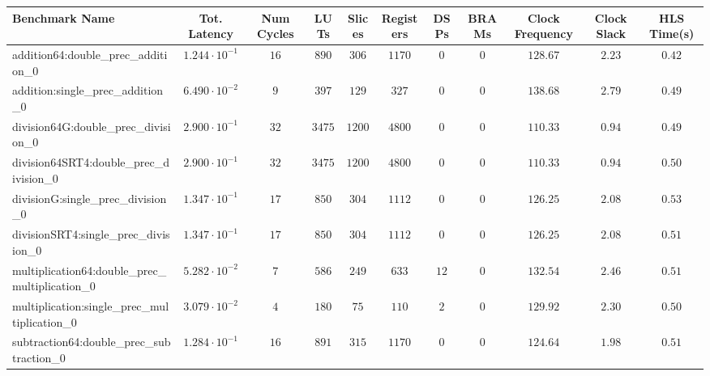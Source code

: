 \begin{tabular}{|l|c|c|c|c|c|c|c|c|c|c|}
\hline
Benchmark Name                                   & Tot. Latency            & Num Cycles & LUTs      & Slices   & Registers & DSPs   & BRAMs & Clock Frequency & Clock Slack & HLS Time(s) \\
\hline
addition64:double\_prec\_addition\_0             & $ 1.244 \cdot 10^{-1} $ & $ 16     $ & $ 890   $ & $ 306  $ & $ 1170  $ & $ 0  $ & $ 0 $ & $ 128.67      $ & $ 2.23    $ & $ 0.42    $ \\
addition:single\_prec\_addition\_0               & $ 6.490 \cdot 10^{-2} $ & $ 9      $ & $ 397   $ & $ 129  $ & $ 327   $ & $ 0  $ & $ 0 $ & $ 138.68      $ & $ 2.79    $ & $ 0.49    $ \\
division64G:double\_prec\_division\_0            & $ 2.900 \cdot 10^{-1} $ & $ 32     $ & $ 3475  $ & $ 1200 $ & $ 4800  $ & $ 0  $ & $ 0 $ & $ 110.33      $ & $ 0.94    $ & $ 0.49    $ \\
division64SRT4:double\_prec\_division\_0         & $ 2.900 \cdot 10^{-1} $ & $ 32     $ & $ 3475  $ & $ 1200 $ & $ 4800  $ & $ 0  $ & $ 0 $ & $ 110.33      $ & $ 0.94    $ & $ 0.50    $ \\
divisionG:single\_prec\_division\_0              & $ 1.347 \cdot 10^{-1} $ & $ 17     $ & $ 850   $ & $ 304  $ & $ 1112  $ & $ 0  $ & $ 0 $ & $ 126.25      $ & $ 2.08    $ & $ 0.53    $ \\
divisionSRT4:single\_prec\_division\_0           & $ 1.347 \cdot 10^{-1} $ & $ 17     $ & $ 850   $ & $ 304  $ & $ 1112  $ & $ 0  $ & $ 0 $ & $ 126.25      $ & $ 2.08    $ & $ 0.51    $ \\
multiplication64:double\_prec\_multiplication\_0 & $ 5.282 \cdot 10^{-2} $ & $ 7      $ & $ 586   $ & $ 249  $ & $ 633   $ & $ 12 $ & $ 0 $ & $ 132.54      $ & $ 2.46    $ & $ 0.51    $ \\
multiplication:single\_prec\_multiplication\_0   & $ 3.079 \cdot 10^{-2} $ & $ 4      $ & $ 180   $ & $ 75   $ & $ 110   $ & $ 2  $ & $ 0 $ & $ 129.92      $ & $ 2.30    $ & $ 0.50    $ \\
subtraction64:double\_prec\_subtraction\_0       & $ 1.284 \cdot 10^{-1} $ & $ 16     $ & $ 891   $ & $ 315  $ & $ 1170  $ & $ 0  $ & $ 0 $ & $ 124.64      $ & $ 1.98    $ & $ 0.51    $ \\

\end{tabular}
